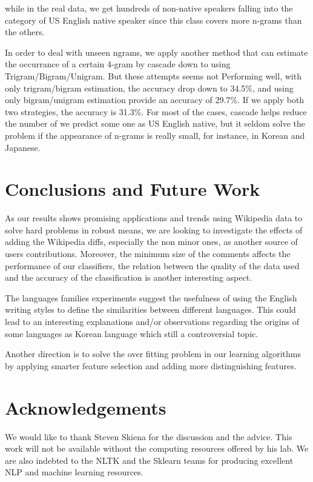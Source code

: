 \documentclass[11pt]{article}
\begin{document}
while in the real data, we get hundreds of non-native speakers falling into the category of US English native speaker since this class covers more n-grams than the others.

In order to deal with unseen ngrams, we apply another method that can estimate the occurrance of a certain 4-gram by cascade down to using Trigram/Bigram/Unigram. But these attempts seems not Performing well, with only trigram/bigram estimation, the accuracy drop down to 34.5\%, and using only bigram/unigram estimation provide an accuracy of 29.7\%. If we apply both two strategies, the accuracy is 31.3\%. For most of the cases, cascade helps reduce the number of we predict some one as US English native, but it seldom solve the problem if the appearance of n-grams is really small, for instance, in Korean and Japanese.  

\section{Conclusions and Future Work}
As our results shows promising applications and trends using Wikipedia data to solve hard problems in robust means, we are looking to investigate the effects of adding the Wikipedia diffs, especially the non minor ones, as another source of users contributions. Moreover, the minimum size of the comments affects the performance of our classifiers, the relation between the quality of the data used and the accuracy of the classification is another interesting aspect.

The languages families experiments suggest the usefulness of using the English writing styles to define the similarities between different languages. This could lead to an interesting explanations and/or observations regarding the origins of some languages as Korean language which still a controversial topic.

Another direction is to solve the over fitting problem in our learning algorithms by applying smarter feature selection and adding more distinguishing features.



\section*{Acknowledgements}
We would like to thank Steven Skiena for the discussion and the advice. This work will not be available without the computing resources offered by his lab. We are also indebted to the NLTK and the Sklearn teams for producing excellent NLP and machine learning resources.
\end{document}
